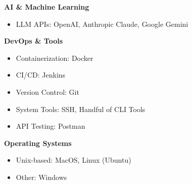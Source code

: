 \begin{itemize}[leftmargin=*, itemsep=0.1em, label={}]
	\textbf{AI \& Machine Learning}
	\begin{itemize}
		\item LLM APIs: OpenAI, Anthropic Claude, Google Gemini
	\end{itemize}
	
	\textbf{DevOps \& Tools}
	\begin{itemize}
		\item Containerization: Docker
		\item CI/CD: Jenkins
		\item Version Control: Git
		\item System Tools: SSH, Handful of CLI Tools
		\item API Testing: Postman
	\end{itemize}
	
	\textbf{Operating Systems}
	\begin{itemize}
		\item Unix-based: MacOS, Linux (Ubuntu)
		\item Other: Windows
	\end{itemize}
\end{itemize}